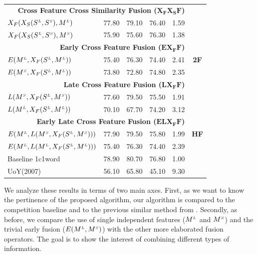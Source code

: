 \begin{table}[htp!]
\begin{tabular}{@{}lrrrrc@{}}
 \midrule
       \multicolumn{5}{r}{\textbf{Cross Feature Cross Similarity Fusion ($\mathbf{X_FX_SF}$)}}   & \multirow{9}{*}{\textbf{2F}}    \\ %

       $X_F(X_S(S^{\scriptscriptstyle L}, S^{\scriptscriptstyle S}), M^{\scriptscriptstyle L})$		&	77.80	&79.10  & 76.40& 1.59 \\	   
       $X_F(X_S(S^{\scriptscriptstyle L}, S^{\scriptscriptstyle S}), M^{\scriptscriptstyle S})$		&	75.90	& 75.60 & 76.30 & 1.38 \\	   
       \multicolumn{5}{r}{\textbf{Early Cross Feature Fusion ($\mathbf{EX_FF}$)}}       \\ %
       
       $E(M^{\scriptscriptstyle L}, X_F(S^{\scriptscriptstyle L}, M^{\scriptscriptstyle L}))$		&	75.40	& 76.30  & 74.40 & 2.41 \\	   
	   $E(M^{\scriptscriptstyle S}, X_F(S^{\scriptscriptstyle L}, M^{\scriptscriptstyle L}))$		&	73.80	& 72.80  & 74.80 & 2.35 \\	   
       \multicolumn{5}{r}{\textbf{Late Cross Feature Fusion ($\mathbf{LX_FF}$)}}       \\ %
	   $L(M^{\scriptscriptstyle S}, X_F(S^{\scriptscriptstyle L}, M^{\scriptscriptstyle S}))$		&	77.60	& 79.50	 & 75.50 & 1.91 \\	   
	   $L(M^{\scriptscriptstyle L}, X_F(S^{\scriptscriptstyle L}, M^{\scriptscriptstyle L}))$		&	70.10	& 67.70 & 74.20 & 3.12 \\	   
       \midrule
       \multicolumn{5}{r}{\textbf{Early Late Cross Feature Fusion ($\mathbf{ELX_FF	}$)}}    & \multirow{3}{*}{\textbf{HF}}   \\ %
	   $E(M^{\scriptscriptstyle L}, L(M^{\scriptscriptstyle S}, X_F(S^{\scriptscriptstyle L}, M^{\scriptscriptstyle S})))$		&	77.90	& 79.50 & 75.80& 1.99 \\	   
	   $E(M^{\scriptscriptstyle L}, L(M^{\scriptscriptstyle L}, X_F(S^{\scriptscriptstyle L}, M^{\scriptscriptstyle L})))$		&	75.40	& 76.30&74.40 & 2.39 \\
	   \midrule
	   \midrule
	   Baseline 1c1word 		&	78.90	& 80.70&76.80 & 1.00 \\ 	   	 	    	   
	   UoY(2007)	&	56.10	& 65.80 &45.10 & 9.30 \\ 	 

		   
       \bottomrule
\end{tabular}
\end{table}

We analyze these results in terms of two main axes. First, as we want to know the pertinence of the proposed algorithm,  our algorithm is compared to the competition baseline and to the previous similar method from \cite{2007.Klapaftis.UOY}. Secondly, as before, we compare the use of single independent features ($M^{\scriptscriptstyle L}$ and $M^{\scriptscriptstyle S}$) and the trivial early fusion ($E(M^{\scriptscriptstyle L}, M^{\scriptscriptstyle S})$) with the other more elaborated fusion operators. The goal is to show the interest of combining different types of information.

